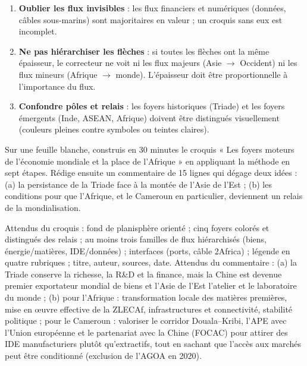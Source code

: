 \documentclass[11pt]{article}
\begin{document}
\begin{attention}
\begin{enumerate}
\item \textbf{Oublier les flux invisibles} : les flux financiers et numériques (données, câbles sous-marins) sont majoritaires en valeur ; un croquis sans eux est incomplet.
\item \textbf{Ne pas hiérarchiser les flèches} : si toutes les flèches ont la même épaisseur, le correcteur ne voit ni les flux majeurs (Asie $\rightarrow$ Occident) ni les flux mineurs (Afrique $\rightarrow$ monde). L'épaisseur doit être proportionnelle à l'importance du flux.
\item \textbf{Confondre pôles et relais} : les foyers historiques (Triade) et les foyers émergents (Inde, ASEAN, Afrique) doivent être distingués visuellement (couleurs pleines contre symboles ou teintes claires).
\end{enumerate}
\end{attention}

\begin{exercice}
Sur une feuille blanche, construis en 30 minutes le croquis « Les foyers moteurs de l'économie mondiale et la place de l'Afrique » en appliquant la méthode en sept étapes. Rédige ensuite un commentaire de 15 lignes qui dégage deux idées : (a) la persistance de la Triade face à la montée de l'Asie de l'Est ; (b) les conditions pour que l'Afrique, et le Cameroun en particulier, deviennent un relais de la mondialisation.
\end{exercice}

\begin{corrige}[Exercice]
Attendus du croquis : fond de planisphère orienté ; cinq foyers colorés et distingués des relais ; au moins trois familles de flux hiérarchisés (biens, énergie/matières, IDE/données) ; interfaces (ports, câble 2Africa) ; légende en quatre rubriques ; titre, auteur, sources, date. Attendus du commentaire : (a) la Triade conserve la richesse, la R\&D et la finance, mais la Chine est devenue premier exportateur mondial de biens et l'Asie de l'Est l'atelier et le laboratoire du monde ; (b) pour l'Afrique : transformation locale des matières premières, mise en œuvre effective de la ZLECAf, infrastructures et connectivité, stabilité politique ; pour le Cameroun : valoriser le corridor Douala--Kribi, l'APE avec l'Union européenne et le partenariat avec la Chine (FOCAC) pour attirer des IDE manufacturiers plutôt qu'extractifs, tout en sachant que l'accès aux marchés peut être conditionné (exclusion de l'AGOA en 2020).
\end{corrige}
\end{document}
